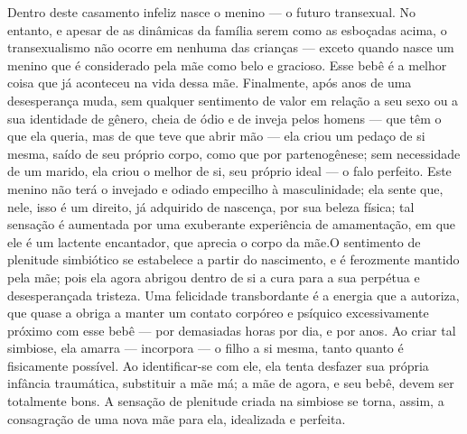 Dentro deste casamento infeliz nasce o menino --- o futuro
transexual. No entanto, e apesar de as dinâmicas da família serem como
as esboçadas acima, o transexualismo não ocorre em nenhuma das crianças
--- exceto quando nasce um menino que é considerado pela mãe como belo
e gracioso. Esse bebê é a melhor coisa que já aconteceu na vida dessa
mãe. Finalmente, após anos de uma desesperança muda, sem qualquer
sentimento de valor em relação a seu sexo ou a sua identidade de
gênero, cheia de ódio e de inveja pelos homens --- que têm o que ela
queria, mas de que teve que abrir mão --- ela criou um pedaço de si
mesma, saído de seu próprio corpo, como que por partenogênese; sem
necessidade de um marido, ela criou o melhor de si, seu próprio ideal
--- o falo perfeito.\idxmaesfalo{} Este menino não terá o invejado e odiado
empecilho à masculinidade; ela sente que, nele, isso é um direito, já
adquirido de nascença, por sua beleza física; tal sensação é aumentada
por uma exuberante experiência de amamentação, em que ele é um lactente
encantador, que aprecia o corpo da mãe.\idxmaestran[|)] O sentimento de plenitude
simbiótico se estabelece a partir do nascimento, e é ferozmente mantido
pela mãe; pois ela agora abrigou dentro de si a cura para a sua
perpétua e desesperançada tristeza. Uma felicidade transbordante é a
energia que a autoriza, que quase a obriga a manter um contato
corpóreo e psíquico excessivamente próximo com esse bebê --- por
demasiadas horas por dia, e por anos. Ao criar tal simbiose, ela amarra
--- incorpora --- o filho a si mesma, tanto quanto é fisicamente
possível. Ao identificar-se com ele, ela tenta desfazer\idxdesfa{} sua própria
infância traumática, substituir a mãe má; a mãe de agora, e seu bebê,
devem ser totalmente bons. A sensação de plenitude criada na simbiose
se torna, assim, a consagração de uma nova mãe para ela, idealizada e
perfeita.

